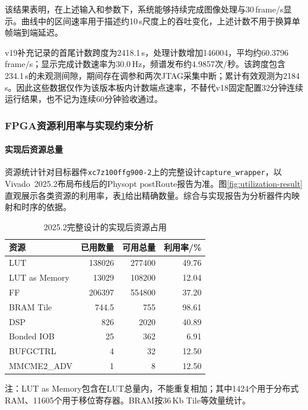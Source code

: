 
该结果表明，在上述输入和参数下，系统能够持续完成图像处理与30\,frame/s显示。曲线中的区间速率用于描述约10\,s尺度上的吞吐变化，上述计数不用于换算单帧端到端延迟。

v19补充记录的首尾计数跨度为2418.1\,s，处理计数增加146004，平均约60.3796\,frame/s；显示完成计数速率为30.0\,Hz，频谱发布约4.9857次/秒。该跨度包含234.1\,s的未观测间隙，期间存在调参和两次JTAG采集中断；累计有效观测为2184\,s。因此这些数据仅作为该版本板内计数端点速率，不替代v18固定配置32分钟连续运行结果，也不记为连续60分钟验收通过。

\subsubsection{FPGA资源利用率与实现约束分析}
\paragraph{实现后资源总量}
资源统计针对目标器件\texttt{xc7z100ffg900-2}上的完整设计\texttt{capture\_wrapper}，以Vivado~2025.2布局布线后的Physopt postRoute报告为准。图\ref{fig:utilization-result}直观展示各类资源的利用率，表\ref{tab:resource-total}给出精确数量。综合与实现报告为分析器件内映射和时序的依据\cite{ug901,ug904}。


\begin{table}[htbp]
\centering\small
\caption{2025.2完整设计的实现后资源占用}\label{tab:resource-total}
\begin{tabular}{@{}lrrr@{}}
\toprule
资源 & 已用数量 & 可用总量 & 利用率/\% \\
\midrule
LUT & 138026 & 277400 & 49.76 \\
LUT as Memory & 13029 & 108200 & 12.04 \\
FF & 206397 & 554800 & 37.20 \\
BRAM Tile & 744.5 & 755 & 98.61 \\
DSP & 826 & 2020 & 40.89 \\
Bonded IOB & 25 & 362 & 6.91 \\
BUFGCTRL & 4 & 32 & 12.50 \\
MMCME2\_ADV & 1 & 8 & 12.50 \\
\bottomrule
\end{tabular}
\par\smallskip
\begin{minipage}{\linewidth}\small
注：LUT as Memory包含在LUT总量内，不能重复相加；其中1424个用于分布式RAM、11605个用于移位寄存器。BRAM按36\,Kb Tile等效量统计。
\end{minipage}
\end{table}

